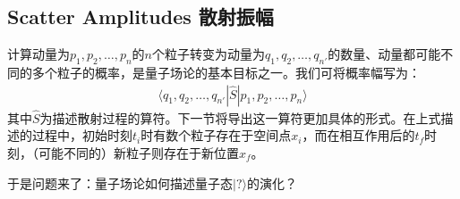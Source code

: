 \subsection{Scatter Amplitudes 散射振幅}\label{sec9.5.1}
计算动量为$p_1,p_2,\ldots,p_n$的$n$个粒子转变为动量为$q_1,q_2,\ldots,q_{n'}$的数量、动量都可能不同的多个粒子的概率，是量子场论的基本目标之一。我们可将概率幅写为：
\begin{align}\label{equ9.47}
\langle q_1,q_2,\ldots,q_{n'}|\hat{S}|p_1,p_2,\ldots,p_n\rangle
\end{align}
其中$\hat{S}$为描述散射过程的算符。下一节将导出这一算符更加具体的形式。在上式描述的过程中，初始时刻$t_i$时有数个粒子存在于空间点$x_i$，而在相互作用后的$t_f$时刻，（可能不同的）新粒子则存在于新位置$x_f$。

于是问题来了：量子场论如何描述量子态$|?\rangle$的演化？

